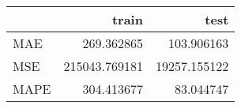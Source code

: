 \begin{tabular}{lrr}
\toprule
{} &          train &          test \\
\midrule
MAE  &     269.362865 &    103.906163 \\
MSE  &  215043.769181 &  19257.155122 \\
MAPE &     304.413677 &     83.044747 \\
\bottomrule
\end{tabular}
